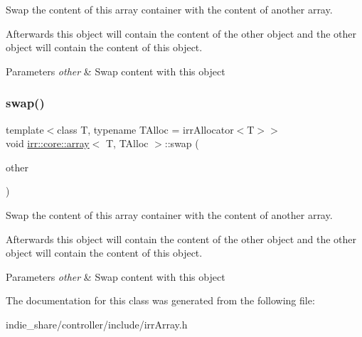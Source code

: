 Swap the content of this array container with the content of another array. 

Afterwards this object will contain the content of the other object and the other object will contain the content of this object. 
\begin{DoxyParams}{Parameters}
{\em other} & Swap content with this object \\
\hline
\end{DoxyParams}
\mbox{\label{classirr_1_1core_1_1array_a8857046f500a2990fc9930b204a3dbad}} 
\subsubsection{\texorpdfstring{swap()}{swap()}\hspace{0.1cm}{\footnotesize\ttfamily [2/2]}}
{\footnotesize\ttfamily template$<$class T, typename T\+Alloc = irr\+Allocator$<$\+T$>$$>$ \\
void \hyperlink{classirr_1_1core_1_1array}{irr\+::core\+::array}$<$ T, T\+Alloc $>$\+::swap (\begin{DoxyParamCaption}\item[{\hyperlink{classirr_1_1core_1_1array}{array}$<$ T, T\+Alloc $>$ \&}]{other }\end{DoxyParamCaption})\hspace{0.3cm}{\ttfamily [inline]}}



Swap the content of this array container with the content of another array. 

Afterwards this object will contain the content of the other object and the other object will contain the content of this object. 
\begin{DoxyParams}{Parameters}
{\em other} & Swap content with this object \\
\hline
\end{DoxyParams}


The documentation for this class was generated from the following file\+:\begin{DoxyCompactItemize}
\item 
indie\+\_\+share/controller/include/irr\+Array.\+h\end{DoxyCompactItemize}
